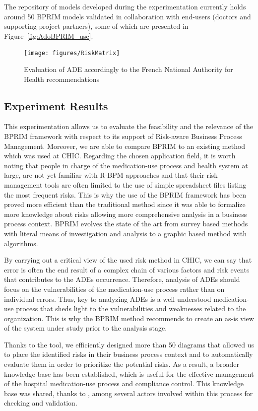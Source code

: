 \documentclass[preprint,3p,times,number]{elsarticle}
\begin{document}
The repository of models developed during the experimentation currently holds around 50 BPRIM models validated in collaboration with end-users (doctors and supporting project partners), some of which are presented in Figure~\ref{fig:AdoBPRIM_use}.

\begin{figure}[h!t]
 \begin{center}
    \texttt{[image: figures/RiskMatrix]}
    \caption{Evaluation of ADE accordingly to the French National Authority for Health recommendations}
    \label{fig:AdoBPRIM_Matrix}
 \end{center}
\end{figure}

\subsection{Experiment Results}
\label{sec:experiment:results}
This experimentation allows us to evaluate the feasibility and the relevance of the BPRIM framework with respect to its support of Risk-aware Business Process Management. Moreover, we are able to compare BPRIM to an existing method which was used at CHIC. Regarding the chosen application field, it is worth noting that people in charge of the medication-use process and health system at large, are not yet familiar with R-BPM approaches and that their risk management tools are often limited to the use of simple spreadsheet files listing the most frequent risks. This is why the use of the BPRIM framework has been proved more efficient than the traditional method since it was able to formalize more knowledge about risks allowing more comprehensive analysis in a business process context. BPRIM evolves the state of the art from survey based methods with literal means of investigation and analysis to a graphic based method with algorithms.

By carrying out a critical view of the used risk method in CHIC, we can say that error is often the end result of a complex chain of various factors and risk events that contributes to the ADEs occurrence. Therefore, analysis of ADEs should focus on the vulnerabilities of the medication-use process rather than on individual errors. Thus, key to analyzing ADEs is a well understood medication-use process that sheds light to the vulnerabilities and weaknesses related to the organization. This is why the BPRIM method recommends to create an as-is view of the system under study prior to the analysis stage.

Thanks to the \adobprim{} tool, we efficiently designed more than 50 diagrams that allowed us to place the identified risks in their business process context and to automatically evaluate them in order to prioritize the potential risks. As a result, a broader knowledge base has been established, which is useful for the effective management of the hospital medication-use process and compliance control. This knowledge base was shared, thanks to \adobprim{}, among several actors involved within this process for checking and validation.
\end{document}
